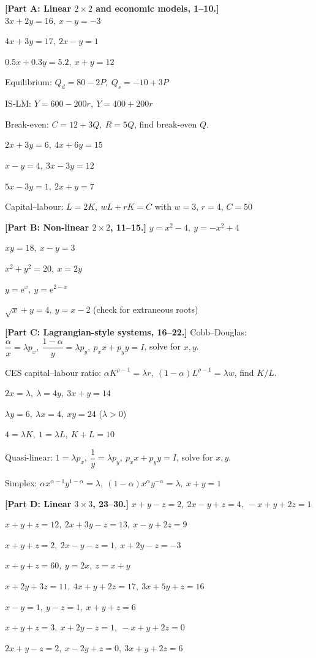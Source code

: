 \begin{problems}
  \item \textbf{[Part A: Linear $2\times 2$ and economic models, 1--10.]}
        $3x+2y=16,\ x-y=-3$
  \item $4x+3y=17,\ 2x-y=1$
  \item $0.5x+0.3y=5.2,\ x+y=12$
  \item Equilibrium: $Q_{d}=80-2P,\ Q_{s}=-10+3P$
  \item IS-LM: $Y=600-200r,\ Y=400+200r$
  \item Break-even: $C=12+3Q,\ R=5Q$, find break-even $Q$.
  \item $2x+3y=6,\ 4x+6y=15$
  \item $x-y=4,\ 3x-3y=12$
  \item $5x-3y=1,\ 2x+y=7$
  \item Capital--labour: $L=2K,\ wL+rK=C$ with $w=3,\,r=4,\,C=50$
  \item \textbf{[Part B: Non-linear $2\times 2$, 11--15.]}
        $y=x^{2}-4,\ y=-x^{2}+4$
  \item $xy=18,\ x-y=3$
  \item $x^{2}+y^{2}=20,\ x=2y$
  \item $y=\mathrm{e}^{x},\ y=\mathrm{e}^{2-x}$
  \item $\sqrt{x}+y=4,\ y=x-2$ (check for extraneous roots)
  \item \textbf{[Part C: Lagrangian-style systems, 16--22.]}
        Cobb--Douglas: $\dfrac{\alpha}{x}=\lambda p_{x},\
        \dfrac{1-\alpha}{y}=\lambda p_{y},\ p_{x}x+p_{y}y=I$, solve
        for $x,y$.
  \item CES capital--labour ratio: $\alpha K^{\rho-1}=\lambda r,\
        (1-\alpha)L^{\rho-1}=\lambda w$, find $K/L$.
  \item $2x=\lambda,\ \lambda=4y,\ 3x+y=14$
  \item $\lambda y=6,\ \lambda x=4,\ xy=24$ ($\lambda>0$)
  \item $4=\lambda K,\ 1=\lambda L,\ K+L=10$
  \item Quasi-linear: $1=\lambda p_{x},\ \dfrac{1}{y}=\lambda p_{y},\
        p_{x}x+p_{y}y=I$, solve for $x,y$.
  \item Simplex: $\alpha x^{\alpha-1}y^{1-\alpha}=\lambda,\
        (1-\alpha)x^{\alpha}y^{-\alpha}=\lambda,\ x+y=1$
  \item \textbf{[Part D: Linear $3\times 3$, 23--30.]}
        $x+y-z=2,\ 2x-y+z=4,\ -x+y+2z=1$
  \item $x+y+z=12,\ 2x+3y-z=13,\ x-y+2z=9$
  \item $x+y+z=2,\ 2x-y-z=1,\ x+2y-z=-3$
  \item $x+y+z=60,\ y=2x,\ z=x+y$
  \item $x+2y+3z=11,\ 4x+y+2z=17,\ 3x+5y+z=16$
  \item $x-y=1,\ y-z=1,\ x+y+z=6$
  \item $x+y+z=3,\ x+2y-z=1,\ -x+y+2z=0$
  \item $2x+y-z=2,\ x-2y+z=0,\ 3x+y+2z=6$
\end{problems}

